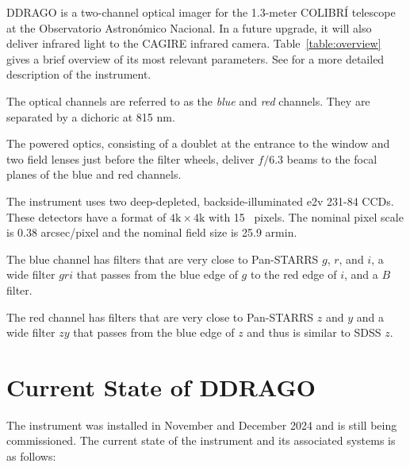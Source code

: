 DDRAGO is a two-channel optical imager for the 1.3-meter COLIBRÍ telescope at the Observatorio Astronómico Nacional. In a future upgrade, it will also deliver infrared light to the CAGIRE infrared camera. Table~\ref{table:overview} gives a brief overview of its most relevant parameters. See \cite{Langarica-2024} for a more detailed description of the instrument.

The optical channels are referred to as the \emph{blue} and \emph{red} channels. They are separated by a dichoric at 815 nm. 

The powered optics, consisting of a doublet at the entrance to the window and two field lenses just before the filter wheels, deliver $f/6.3$ beams to the focal planes of the blue and red channels.

The instrument uses two deep-depleted, backside-illuminated e2v 231-84 CCDs. These detectors have a format of $4\mathrm{k}\times4\mathrm{k}$ with 15~{\micron} pixels. The nominal pixel scale is 0.38 \unit{arcsec/pixel} and the nominal field size is 25.9 \unit{armin}.

The blue channel has filters that are very close to Pan-STARRS $g$, $r$, and $i$, a wide filter $gri$ that passes from the blue edge of $g$ to the red edge of $i$, and a $B$ filter.

The red channel has filters that are very close to Pan-STARRS $z$ and $y$ and a wide filter $zy$ that passes from the blue edge of $z$ and thus is similar to SDSS $z$.

\section{Current State of DDRAGO}

The instrument was installed in November and December 2024 and is still being commissioned. The current state of the instrument and its associated systems is as follows:

